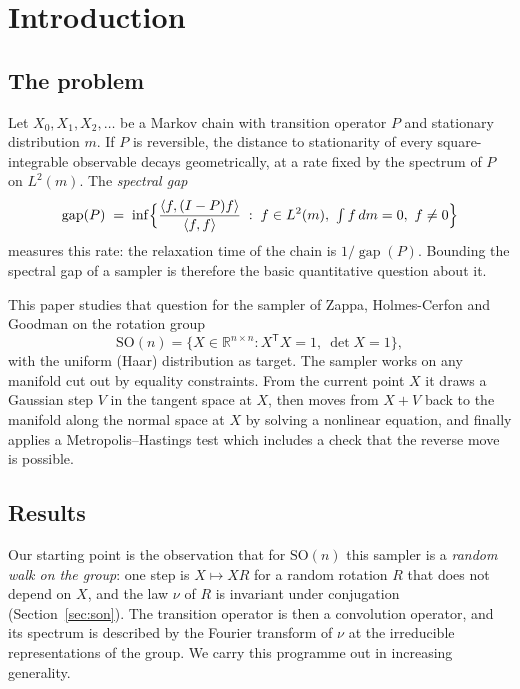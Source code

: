 \documentclass[11pt]{amsart}
\theoremstyle{definition}
\theoremstyle{remark}
\newcommand{\R}{\mathbb{R}}
\newcommand{\SO}{\mathrm{SO}}
\newcommand{\ip}[2]{\langle #1,#2\rangle}
\newcommand{\gap}{\operatorname{gap}}
\newcommand{\transp}{^{\mathsf T}}
\begin{document}
\maketitle

\section{Introduction}

\subsection{The problem}
Let $X_0,X_1,X_2,\dots$ be a Markov chain with transition operator $P$ and stationary
distribution $m$.  If $P$ is reversible, the distance to stationarity of every square-integrable
observable decays geometrically, at a rate fixed by the spectrum of $P$ on $L^2(m)$.  The
\emph{spectral gap}
\[
  \gap(P)\;=\;\inf\Bigl\{\frac{\ip{f}{(I-P)f}}{\ip{f}{f}} \;:\; f\in L^2(m),\ \textstyle\int f\,dm=0,\ f\ne 0\Bigr\}
\]
measures this rate: the relaxation time of the chain is $1/\gap(P)$.  Bounding the spectral gap
of a sampler is therefore the basic quantitative question about it.

This paper studies that question for the sampler of Zappa, Holmes-Cerfon and Goodman
\cite{ZHG} on the rotation group
\[
  \SO(n)=\{X\in\R^{n\times n} : X\transp X=1,\ \det X=1\},
\]
with the uniform (Haar) distribution as target.  The sampler works on any manifold cut out by
equality constraints.  From the current point $X$ it draws a Gaussian step $V$ in the tangent
space at $X$, then moves from $X+V$ back to the manifold along the normal space at $X$ by
solving a nonlinear equation, and finally applies a Metropolis--Hastings test which includes a
check that the reverse move is possible.

\subsection{Results}
Our starting point is the observation that for $\SO(n)$ this sampler is a \emph{random walk on
the group}: one step is $X\mapsto XR$ for a random rotation $R$ that does not depend on $X$,
and the law $\nu$ of $R$ is invariant under conjugation (Section~\ref{sec:son}).  The transition
operator is then a convolution operator, and its spectrum is described by the Fourier transform
of $\nu$ at the irreducible representations of the group.  We carry this programme out in
increasing generality.
\end{document}
